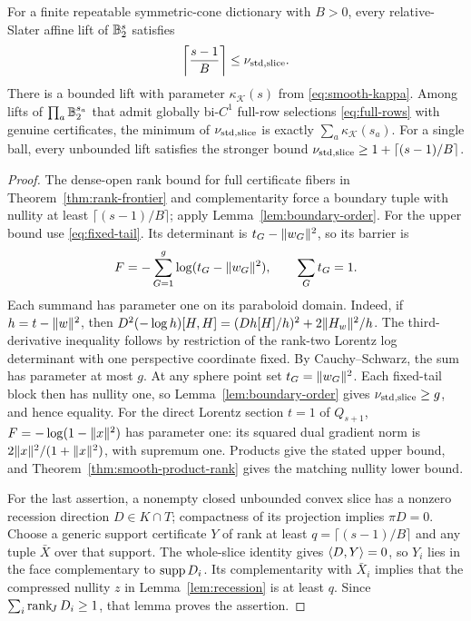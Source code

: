 \begin{proposition}\label{prop:barrier-frontiers}
For a finite repeatable symmetric-cone dictionary with $B>0$, every
relative-Slater affine lift of $\mathbb B_2^s$ satisfies
\begin{equation}\label{eq:general-barrier-bracket}
 \left\lceil\frac{s-1}{B}\right\rceil\leq\nu_{\mathrm{std},\mathrm{slice}}.
\end{equation}
There is a bounded lift with parameter $\kappa_{\mathscr K}(s)$ from
\eqref{eq:smooth-kappa}. Among lifts of $\prod_a\mathbb B_2^{s_a}$ that admit
globally bi-$C^1$ full-row selections \eqref{eq:full-rows} with genuine
certificates, the minimum of $\nu_{\mathrm{std},\mathrm{slice}}$ is exactly
$\sum_a\kappa_{\mathscr K}(s_a)$.
For a single ball, every unbounded lift satisfies the stronger bound
$\nu_{\mathrm{std},\mathrm{slice}}\geq1+\lceil(s-1)/B\rceil$.
\end{proposition}
\begin{proof}
The dense-open rank bound for full certificate fibers in
Theorem~\ref{thm:rank-frontier} and complementarity force a
boundary tuple with nullity at least $\lceil(s-1)/B\rceil$; apply
Lemma~\ref{lem:boundary-order}. For the upper bound use
\eqref{eq:fixed-tail}. Its determinant is $t_G-\lVert w_G\rVert^2$, so its
barrier is
\begin{equation}\label{eq:grouped-barrier}
 F=-\sum_{G=1}^{g}\log(t_G-\lVert w_G\rVert^2),\qquad\sum_Gt_G=1.
\end{equation}
Each summand has parameter one on its paraboloid domain. Indeed, if
$h=t-\lVert w\rVert^2$, then
$D^2(-\log h)[H,H]=(Dh[H]/h)^2+2\lVert H_w\rVert^2/h$.
The third-derivative inequality follows by restriction of the rank-two
Lorentz log determinant with one perspective coordinate fixed.
By Cauchy--Schwarz, the sum has parameter at most $g$.
At any sphere point set $t_G=\lVert w_G\rVert^2$. Each fixed-tail block then
has nullity one, so Lemma~\ref{lem:boundary-order} gives $\nu_{\mathrm{std},\mathrm{slice}}\geq g$,
and hence equality.
For the direct Lorentz section $t=1$ of $Q_{s+1}$, $F=-\log(1-\lVert x\rVert^2)$ has parameter one:
its squared dual gradient norm is
$2\lVert x\rVert^2/(1+\lVert x\rVert^2)$, with supremum one.
Products give the stated upper bound, and
Theorem~\ref{thm:smooth-product-rank} gives the matching nullity lower
bound.

For the last assertion, a nonempty closed unbounded convex slice has a
nonzero recession direction $D\in K\cap T$; compactness of its projection
implies $\pi D=0$. Choose a generic support certificate $Y$ of rank at
least $q=\lceil(s-1)/B\rceil$ and any tuple $\bar X$ over that support.
The whole-slice identity gives $\langle D,Y\rangle=0$, so $Y_i$ lies in the face
complementary to $\operatorname{supp} D_i$. Its complementarity with $\bar X_i$ implies
that the compressed nullity $z$ in Lemma~\ref{lem:recession} is at least
$q$. Since $\sum_i\operatorname{rank}_{\!J} D_i\geq1$, that lemma proves the assertion.
\end{proof}

